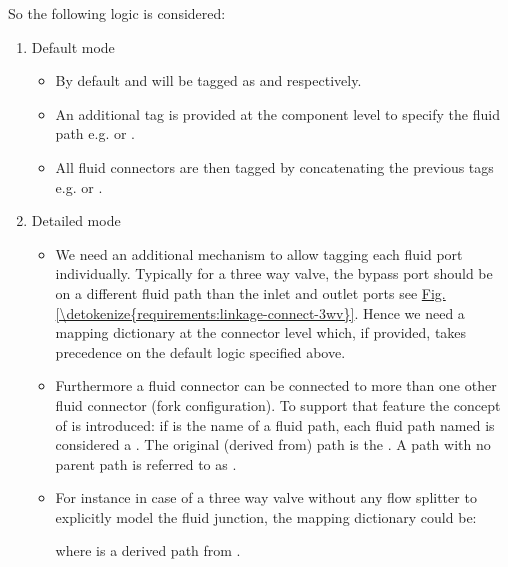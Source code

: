 \documentclass[letterpaper,10pt, openany,english]{sphinxmanual}
\begin{document}
So the following logic is considered:
\begin{enumerate}
%
\item {} 
Default mode
\begin{itemize}
\item {} 
By default  and  will be tagged as  and  respectively.

\item {} 
An additional tag is provided at the component level to specify the fluid path e.g.  or .

\item {} 
All fluid connectors are then tagged by concatenating the previous tags e.g.  or .

\end{itemize}

\item {} 
Detailed mode
\begin{itemize}
\item {} 
We need an additional mechanism to allow tagging each fluid port individually. Typically for a three way valve, the bypass port should be on a different fluid path than the inlet and outlet ports see \hyperref[\detokenize{requirements:linkage-connect-3wv}]{Fig.\@ \ref{\detokenize{requirements:linkage-connect-3wv}}}. Hence we need a mapping dictionary at the connector level which, if provided, takes precedence on the default logic specified above.

\item {} 
Furthermore a fluid connector can be connected to more than one other fluid connector (fork configuration). To support that feature the concept of  is introduced: if  is the name of a fluid path, each fluid path named  is considered a . The original (derived from) path is the . A path with no parent path is referred to as .

\item {} 
For instance in case of a three way valve without any flow splitter to explicitly model the fluid junction, the mapping dictionary could be:

 where  is a derived path from .

\end{itemize}

\end{enumerate}
\end{document}
